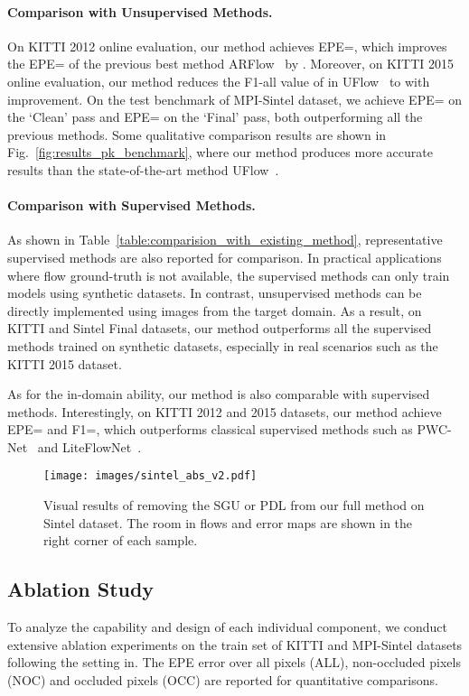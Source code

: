 \documentclass[final]{cvpr}
\begin{document}
\paragraph{Comparison with Unsupervised Methods.}
On KITTI 2012 online evaluation, our method achieves EPE=, which improves the EPE= of the previous best method ARFlow~\cite{liu2020learning} by . 
Moreover, on KITTI 2015 online evaluation, our method reduces the F1-all value of  in UFlow~\cite{jonschkowski2020matters} to  with  improvement. On the test benchmark of 
MPI-Sintel dataset, we achieve EPE= on the `Clean' pass and EPE= on the `Final' pass, both outperforming all the previous methods. 
Some qualitative comparison results are shown in Fig.~\ref{fig:results_pk_benchmark}, where our method produces more accurate results than the state-of-the-art method UFlow~\cite{jonschkowski2020matters}. 
\vspace{-10pt} 

\paragraph{Comparison with Supervised Methods. }
As shown in Table~\ref{table:comparision_with_existing_method}, representative supervised methods are also reported for comparison. 
In practical applications where flow ground-truth is not available, the supervised methods can only train models using synthetic datasets. In contrast, unsupervised methods can be directly implemented using images from the target domain. As a result, on KITTI and Sintel Final datasets, our method outperforms all the supervised methods trained on synthetic datasets, especially in real scenarios such as the KITTI 2015 dataset. 

As for the in-domain ability, our method is also comparable with supervised methods. Interestingly, on KITTI 2012 and 2015 datasets, our method achieve EPE= and F1=, which outperforms classical supervised methods such as PWC-Net~\cite{pwc_net} and LiteFlowNet~\cite{LiteFlowNet}.

\begin{figure*}
	\centering
	\texttt{[image: images/sintel\_abs\_v2.pdf]}
	\caption{Visual results of removing the SGU or PDL from our full method on Sintel dataset. The room in flows and error maps are shown in the right corner of each sample.  
	}\label{fig:ablation_sgu_and_pdl}
\end{figure*}


\subsection{Ablation Study}\label{sec:Ablation Study}
To analyze the capability and design of each individual component, we conduct extensive ablation experiments on the train set of KITTI and MPI-Sintel datasets following the setting in\cite{Liu2019CVPR,simFlow2020eccv}. The EPE error over all pixels (ALL), non-occluded pixels (NOC) and occluded pixels (OCC) are reported for quantitative comparisons.
\vspace{-10pt} 
\end{document}
